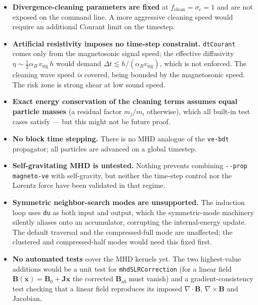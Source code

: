 \begin{itemize}
    \item \textbf{Divergence-cleaning parameters are fixed} at $f_\mathrm{clean} = \sigma_c = 1$ and are not exposed on the command line. A more aggressive cleaning speed would require an additional Courant limit on the timestep.
    \item \textbf{Artificial resistivity imposes no time-step constraint.} \texttt{dtCourant} comes only from the magnetosonic signal speed; the effective diffusivity $\eta \sim \tfrac{1}{2}\alpha_B\, v_\mathrm{sig}\, h$ would demand $\Delta t \lesssim h/(\alpha_B v_\mathrm{sig})$, which is not enforced. The cleaning wave speed \emph{is} covered, being bounded by the magnetosonic speed. The risk zone is strong shear at low sound speed.
    \item \textbf{Exact energy conservation of the cleaning terms assumes equal particle masses} (a residual factor $m_j/m_i$ otherwise), which all built-in test cases satisfy --- but this might not be future proof.
    \item \textbf{No block time stepping.} There is no MHD analogue of the \texttt{ve-bdt} propagator; all particles are advanced on a global timestep.
    \item \textbf{Self-gravitating MHD is untested.} Nothing prevents combining \texttt{-{}-prop magneto-ve} with self-gravity, but neither the time-step control nor the Lorentz force have been validated in that regime.
    \item \textbf{Symmetric neighbor-search modes are unsupported.} The induction loop uses \texttt{du} as both input and output, which the symmetric-mode machinery silently aliases onto an accumulator, corrupting the internal-energy update. The default traversal and the compressed-full mode are unaffected; the clustered and compressed-half modes would need this fixed first.
    \item \textbf{No automated tests} cover the MHD kernels yet. The two highest-value additions would be a unit test for \texttt{mhdSLRCorrection} (for a linear field $\mathbf{B}(\mathbf{x}) = \mathbf{B}_0 + \mathbf{J}\mathbf{x}$ the corrected $\mathbf{B}_{ab}$ must vanish) and a gradient-consistency test checking that a linear field reproduces its imposed $\nabla\cdot\mathbf{B}$, $\nabla\times\mathbf{B}$ and Jacobian.
\end{itemize}
